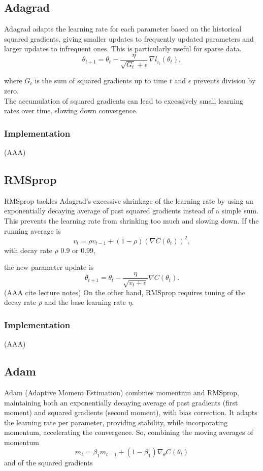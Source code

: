 \documentclass[
 reprint,            %
 amsmath,amssymb,
 aps,
]{revtex4-2}
\begin{document}
\subsection{Adagrad}
Adagrad adapts the learning rate for each parameter based on the historical squared gradients, giving smaller updates to frequently updated parameters and larger updates to infrequent ones. This is particularly useful for sparse data.  
\[
\theta_{t+1} = \theta_t - \frac{\eta}{\sqrt{G_t} + \epsilon} \, \nabla l_{i_t}(\theta_t),
\]

where \(G_t\) is the sum of squared gradients up to time \(t\) and \(\epsilon\) prevents division by zero.  \\

The accumulation of squared gradients can lead to excessively small learning rates over time, slowing down convergence.

\subsubsection{Implementation}
(AAA)

\subsection{RMSprop}
RMSprop tackles Adagrad's excessive shrinkage of the learning rate by using an exponentially decaying average of past squared gradients instead of a simple sum. This prevents the learning rate from shrinking too much and slowing down.  
If the running average is
\[
v_t = \rho v_{t-1} + (1 - \rho)\left( \nabla C(\theta_t) \right)^2,
\]
with decay rate \(\rho\) 0.9 or 0.99,

the new parameter update is
\[\theta_{t+1} = \theta_t - \frac{\eta}{\sqrt{v_t + \epsilon}} \nabla C(\theta_t).
\]
(AAA cite lecture notes)
On the other hand, RMSprop requires tuning of the decay rate \(\rho\) and the base learning rate \(\eta\).

\subsubsection{Implementation}
(AAA)

\subsection{Adam}
Adam (Adaptive Moment Estimation) combines momentum and RMSprop, maintaining both an exponentially decaying average of past gradients (first moment) and squared gradients (second moment), with bias correction. It adapts the learning rate per parameter, providing stability, while incorporating momentum, accelerating the convergence.
So, combining the moving averages of momentum
\[
m_t = \beta_1 m_{t-1} + (1-\beta_1) \nabla_\theta C(\theta_t)
\]  
and of the squared gradients
\end{document}

